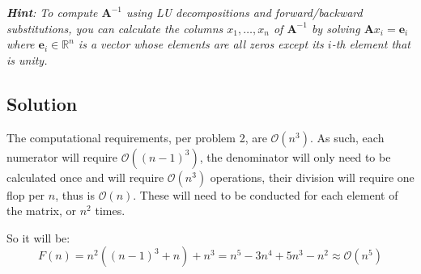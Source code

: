 \documentclass[11pt]{report}
\theoremstyle{definition}
\newcommand{\mat}[1]{\mathbf{#1}}
\begin{document}
\textit{
	\textbf{Hint}: To compute $\mat{A}^{-1}$ using LU decompositions and
	forward/backward substitutions, you can calculate the columns $x_1,\ldots,x_n$
	of $\mat{A}^{-1}$ by solving $\mat{A}x_i=\mat{e}_i$ where $\mat{e}_i\in\mathbb{R}^n$
	is a vector whose elements are all zeros except its $i$-th element that is unity.
}

\subsection*{Solution}
The computational requirements, per problem 2, are $\mathcal{O}(n^3)$. As such,
each numerator will require $\mathcal{O}((n-1)^3)$, the denominator will only
need to be calculated once and will require $\mathcal{O}(n^3)$ operations, their
division will require one flop per $n$, thus is $\mathcal{O}(n)$. These will need
to be conducted for each element of the matrix, or $n^2$ times.

So it will be:
\[F(n) = n^2((n-1)^3+n)+n^3 = n^5-3n^4+5n^3-n^2 \approx \mathcal{O}(n^5)\]


\newpage
\printbibliography
\end{document}
